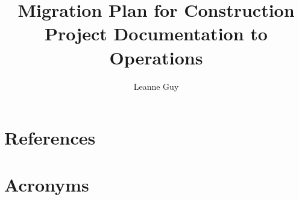 \documentclass[OPS,authoryear,toc]{lsstdoc}
\title{Migration Plan for Construction Project Documentation to Operations}
\author{%
Leanne Guy
}
\date{\vcsDate}
\begin{document}
\maketitle


\appendix
\section{References} \label{sec:bib}
\renewcommand{\refname}{} %


\section{Acronyms} \label{sec:acronyms}

\end{document}
